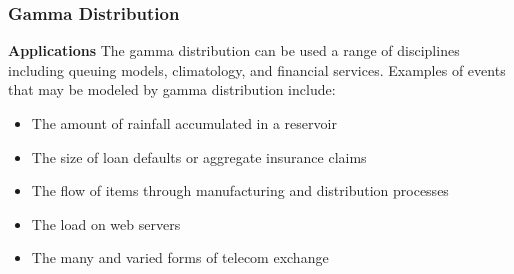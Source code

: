 \documentclass[IntroMain.tex]{subfiles}
\begin{document}
\begin{frame}
\frametitle{Gamma Distribution}
\textbf{Applications}
The gamma distribution can be used a range of disciplines including queuing models, climatology, and financial services. Examples of events that may be modeled by gamma distribution include:
\begin{itemize}
\item The amount of rainfall accumulated in a reservoir
\item The size of loan defaults or aggregate insurance claims
\item The flow of items through manufacturing and distribution processes
\item The load on web servers
\item The many and varied forms of telecom exchange
\end{itemize}

\end{frame}
\end{document}
